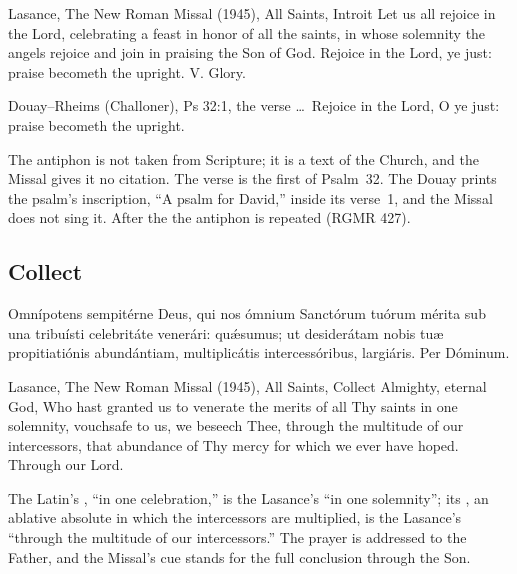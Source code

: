 \begin{englishwitness}{Lasance, The New Roman Missal (1945), All Saints, Introit}
Let us all rejoice in the Lord, celebrating a feast in honor of all the
saints, in whose solemnity the angels rejoice and join in praising the Son of
God. Rejoice in the Lord, ye just: praise becometh the upright. V. Glory.
\end{englishwitness}

\begin{englishwitness}{Douay--Rheims (Challoner), Ps 32:1, the verse}
\dots\ Rejoice in the Lord, O ye just: praise becometh the upright.
\end{englishwitness}

\noindent The antiphon is not taken from Scripture; it is a text of the
Church, and the Missal gives it no citation. The verse is the first of
Psalm~32. The Douay prints the psalm's inscription, ``A psalm for David,''
inside its verse~1, and the Missal does not sing it. After the  the antiphon is repeated (RGMR 427).

\subsection{Collect}
\label{proper-collect}


\begin{latinproper}
Omnípotens sempitérne Deus, qui nos ómnium Sanctórum tuórum mérita sub una
tribuísti celebritáte venerári: quǽsumus; ut desiderátam nobis tuæ
propitiatiónis abundántiam, multiplicátis intercessóribus, largiáris. Per
Dóminum.
\end{latinproper}

\begin{englishwitness}{Lasance, The New Roman Missal (1945), All Saints, Collect}
Almighty, eternal God, Who hast granted us to venerate the merits of all Thy
saints in one solemnity, vouchsafe to us, we beseech Thee, through the
multitude of our intercessors, that abundance of Thy mercy for which we ever
have hoped. Through our Lord.
\end{englishwitness}

\noindent The Latin's , ``in one
celebration,'' is the Lasance's ``in one solemnity''; its
, an ablative absolute in which the
intercessors are multiplied, is the Lasance's ``through the multitude of our
intercessors.'' The prayer is addressed to the Father, and the Missal's cue
 stands for the full conclusion through the Son.

